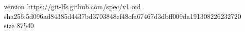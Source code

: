 version https://git-lfs.github.com/spec/v1
oid sha256:5d096ad84385d4437bd3703848ef48cfa67467d3dbff009da191308226232720
size 87540
